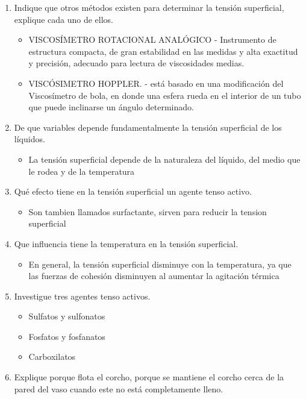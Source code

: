 \documentclass[11pt, letterpaper]{article}
\begin{document}
\begin{enumerate}
   \item Indique que otros métodos existen para determinar la tensión superficial, explique cada uno de ellos.
   \begin{itemize}
     \item VISCOSÍMETRO ROTACIONAL ANALÓGICO - Instrumento de estructura compacta, de gran estabilidad en las medidas y alta exactitud y precisión, adecuado para lectura de viscosidades medias.
     \item VISCÓSIMETRO HOPPLER. - está basado en una modificación del Viscosímetro de bola, en donde una esfera rueda en el interior de un tubo que puede inclinarse un ángulo determinado. 
   \end{itemize}
   \item De que variables depende fundamentalmente la tensión superficial de los líquidos.
   \begin{itemize}
     \item La tensión superficial depende de la naturaleza del líquido, del medio que le rodea y de la temperatura
   \end{itemize}
   \item Qué efecto tiene en la tensión superficial un agente tenso activo.
   \begin{itemize}
     \item Son tambien llamados surfactante, sirven para reducir la tension superficial
   \end{itemize}
   \item Que influencia tiene la temperatura en la tensión superficial.
   \begin{itemize}
     \item En general, la tensión superficial disminuye con la temperatura, ya que las fuerzas de cohesión disminuyen al aumentar la agitación térmica
   \end{itemize}
   \item Investigue tres agentes tenso activos.
   \begin{itemize}
     \item Sulfatos y sulfonatos
    \item Fosfatos y fosfanatos
\item     Carboxilatos
   \end{itemize}
   \item Explique porque flota el corcho, porque se mantiene el corcho cerca de la pared del vaso cuando este no está completamente lleno.
   \begin{itemize}

\end{itemize}
\end{enumerate}
\end{document}
